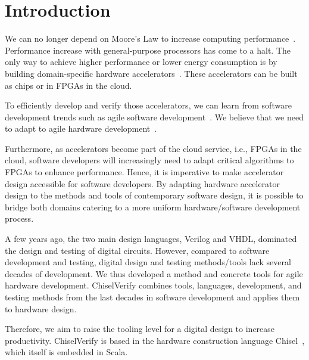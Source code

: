 \documentclass[conference]{IEEEtran}
\begin{document}
\section{Introduction}
\label{sec:introduction}

We can no longer depend on Moore's Law to increase computing performance~\cite{dark-silicon:2011}.
Performance increase with general-purpose processors has come to a halt.
The only way to achieve higher performance or lower energy consumption
is by building domain-specific hardware accelerators~\cite{domain-hw-acc:2020}.
These accelerators can be built as chips or in FPGAs in the cloud.

To efficiently develop and verify those accelerators, we can learn from software development trends such as agile software development~\cite{agile:manifesto}.
We believe that we need to adapt to agile hardware development~\cite{henn-patt:turing:2019}.

Furthermore, as accelerators become part of the cloud service, i.e., FPGAs in the cloud,
software developers will increasingly need to adapt critical algorithms to FPGAs to enhance performance.
Hence, it is imperative to make accelerator design accessible for software developers.
By adapting hardware accelerator design to the methods and tools of contemporary software design,
it is possible to bridge both domains catering to a more uniform hardware/software development process.

A few years ago, the two main design languages, Verilog and VHDL, dominated the
design and testing of digital circuits.
However, compared to software development and testing, digital design and testing methods/tools 
lack several decades of development.
We thus developed a method and concrete tools for agile hardware development.
ChiselVerify combines tools, languages, development, and testing methods from the last decades in
software development and applies them to hardware design.

Therefore, we aim to raise the tooling level for a digital design to increase productivity.
ChiselVerify is based in the hardware construction language Chisel~\cite{chisel:dac2012},
which itself is embedded in Scala.


\end{document}
